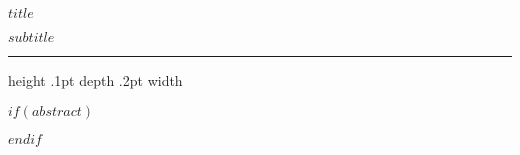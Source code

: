 
\bigskip

\begin{center}
\centering\textbf{\sffamily\Large $title$} 

\centering\textbf{\sffamily\normalsize $subtitle$}
\end{center}

\bigskip
\hrule height .1pt depth .2pt width \textwidth

\bigskip

$if(abstract)$
\begin{abstract}
$abstract$
\end{abstract}
$endif$

